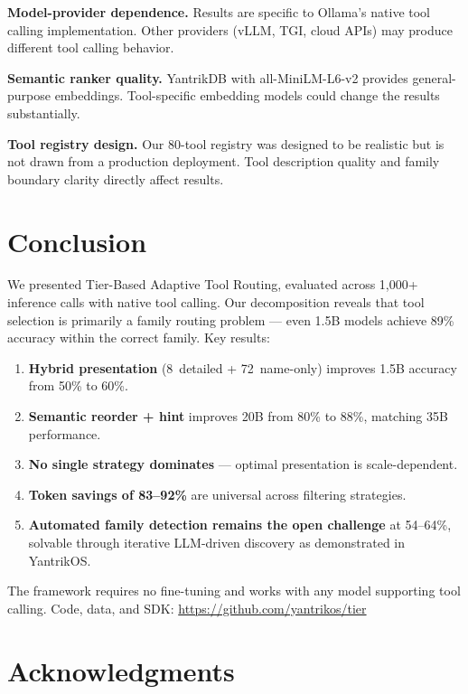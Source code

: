 \documentclass[11pt]{article}
\begin{document}
\textbf{Model-provider dependence.} Results are specific to Ollama's native tool calling implementation. Other providers (vLLM, TGI, cloud APIs) may produce different tool calling behavior.

\textbf{Semantic ranker quality.} YantrikDB with all-MiniLM-L6-v2 provides general-purpose embeddings. Tool-specific embedding models could change the results substantially.

\textbf{Tool registry design.} Our 80-tool registry was designed to be realistic but is not drawn from a production deployment. Tool description quality and family boundary clarity directly affect results.

\section{Conclusion}

We presented Tier-Based Adaptive Tool Routing, evaluated across 1,000+ inference calls with native tool calling. Our decomposition reveals that tool selection is primarily a family routing problem --- even 1.5B models achieve 89\% accuracy within the correct family. Key results:

\begin{enumerate}[nosep,leftmargin=*]
  \item \textbf{Hybrid presentation} (8~detailed + 72~name-only) improves 1.5B accuracy from 50\% to 60\%.
  \item \textbf{Semantic reorder + hint} improves 20B from 80\% to 88\%, matching 35B performance.
  \item \textbf{No single strategy dominates} --- optimal presentation is scale-dependent.
  \item \textbf{Token savings of 83--92\%} are universal across filtering strategies.
  \item \textbf{Automated family detection remains the open challenge} at 54--64\%, solvable through iterative LLM-driven discovery as demonstrated in YantrikOS.
\end{enumerate}

The framework requires no fine-tuning and works with any model supporting tool calling. Code, data, and SDK: \url{https://github.com/yantrikos/tier}

\section*{Acknowledgments}
\end{document}
